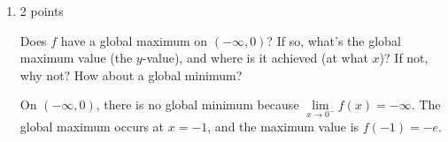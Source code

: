 \documentclass{article}
\begin{document}
\begin{enumerate}
\begin{enumerate}
    \begin{solution}
      We need to make a sign chart for $f'(x)$. To find $f'(x)$, we use the Quotient Rule:
      \begin{align*}
        f'(x) &= \frac{d}{dx}\!\left(\frac{e^{-x}}{x}\right) \\
        &= \frac{(-e^{-x})(x) - (e^{-x})(1)}{x^2} \\
        &= \frac{-e^{-x}(x+1)}{x^2}
      \end{align*}
      We can see that $f'(x)$ is undefined when $x=0$ and is zero when $x=-1$. Testing
      values gives us the following sign chart.
      \begin{center}
      \end{center}
      Based on the sign chart, $f$ is increasing on $(-\infty, -1)$, and
      decreasing on $(-1, 0)$ and $(0, \infty)$.
      
    \end{solution}

  \item \label{e^-x/x-max}

    \begin{grading}
      2 points
    \end{grading}

    \begin{problem}[\vfill]
      Does $f$ have a global maximum on $(-\infty, 0)$? If so, what's the global maximum value (the $y$-value), and where is it achieved (at what $x$)? If not, why not? How about a global minimum?
    \end{problem}

    \begin{solution}
      On $(-\infty, 0)$, there is no global minimum because 
      $\lim\limits_{x\to 0^-}f(x)=-\infty$. The global maximum occurs at $x=-1$,
      and the maximum value is $f(-1)=-e$.
    \end{solution}


\end{enumerate}
\end{enumerate}
\end{document}
